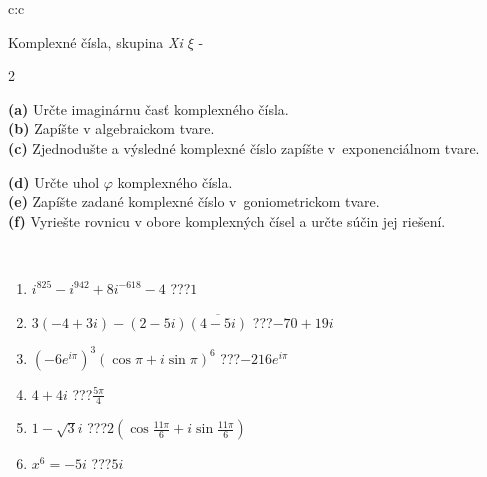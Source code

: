\documentclass[10pt]{report}
\begin{document}
\begin{tabular}{c:c}
\begin{minipage}[c][104.5mm][t]{0.5\linewidth}
\begin{center}
\vspace{7mm}
{\huge Komplexné čísla, skupina \textit{Xi $\xi$} -}\\[5mm]
\begin{minipage}{0.95\linewidth}
\begin{center}
{\small \begin{multicols}{2} \raggedright
\textbf{(a)} Určte imaginárnu časť komplexného čísla. \\[1mm]
\textbf{(b)} Zapíšte v algebraickom tvare. \\[1mm]
\textbf{(c)} Zjednodušte a výsledné komplexné číslo zapíšte v~exponenciálnom tvare. \par \columnbreak
\textbf{(d)} Určte uhol \(\varphi\) komplexného čísla. \\[1mm]
\textbf{(e)} Zapíšte zadané komplexné číslo v~goniometrickom tvare. \\[1mm]
\textbf{(f)} Vyriešte rovnicu v obore komplexných čísel a určte súčin jej riešení.
\end{multicols}
}
\end{center}
\end{minipage}
\\[4mm]
\begin{minipage}{0.79\linewidth}
\begin{center}
\begin{varwidth}{\linewidth}
\begin{enumerate}
\large
\item $i^{825}-i^{942}+8i^{-618}-4$\quad \dotfill\; ???\;\dotfill \quad $1$
\item $3(-4+3i)-(2-5i)\overline{(4-5i)}$\quad \dotfill\; ???\;\dotfill \quad $-70+19i$
\item $\left(-6e^{i\pi}\right)^{3}\left(\cos{\pi}+i\sin{\pi}\right)^{6}$\quad \dotfill\; ???\;\dotfill \quad $-216e^{i\pi}$
\item $4+4i$\quad \dotfill\; ???\;\dotfill \quad $\frac{5\pi}{4}$
\item $1-\sqrt{3}i$\quad \dotfill\; ???\;\dotfill \quad $2\left(\cos{\frac{11\pi}{6}}+i\sin{\frac{11\pi}{6}}\right)$
\item $x^6=-5i$\quad \dotfill\; ???\;\dotfill \quad $5i$
\end{enumerate}
\end{varwidth}
\end{center}

\end{minipage}
\end{center}
\end{minipage}
\end{tabular}
\end{document}
